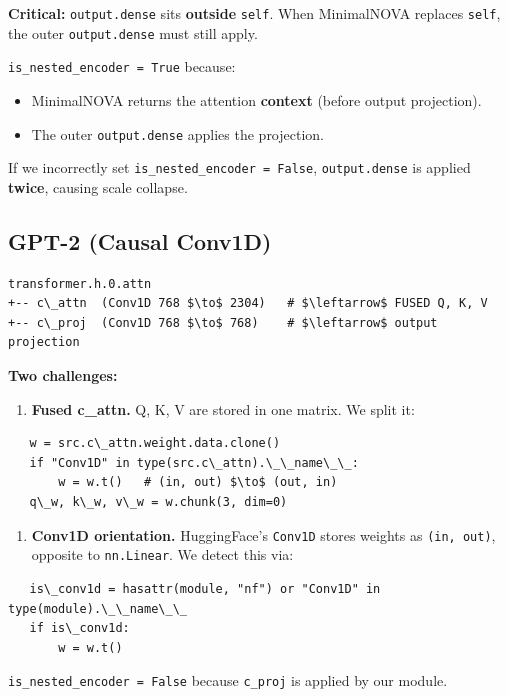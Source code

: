 \textbf{Critical:} \texttt{output.dense} sits \textbf{outside} \texttt{self}. When MinimalNOVA 
replaces \texttt{self}, the outer \texttt{output.dense} must still apply.

\texttt{is\_nested\_encoder = True} because:
\begin{itemize}
\item MinimalNOVA returns the attention \textbf{context} (before output projection).
\item The outer \texttt{output.dense} applies the projection.

\end{itemize}
If we incorrectly set \texttt{is\_nested\_encoder = False}, \texttt{output.dense} is applied 
\textbf{twice}, causing scale collapse.

\subsection{GPT-2 (Causal Conv1D)}

\begin{lstlisting}
transformer.h.0.attn
+-- c\_attn  (Conv1D 768 $\to$ 2304)   # $\leftarrow$ FUSED Q, K, V
+-- c\_proj  (Conv1D 768 $\to$ 768)    # $\leftarrow$ output projection
\end{lstlisting}

\textbf{Two challenges:}

\begin{enumerate}
\item \textbf{Fused c\_attn.} Q, K, V are stored in one matrix. We split it:
\end{enumerate}
\begin{lstlisting}
   w = src.c\_attn.weight.data.clone()
   if "Conv1D" in type(src.c\_attn).\_\_name\_\_:
       w = w.t()   # (in, out) $\to$ (out, in)
   q\_w, k\_w, v\_w = w.chunk(3, dim=0)
\end{lstlisting}

\begin{enumerate}
\item \textbf{Conv1D orientation.} HuggingFace's \texttt{Conv1D} stores weights as
  \texttt{(in, out)}, opposite to \texttt{nn.Linear}. We detect this via:
\end{enumerate}
\begin{lstlisting}
   is\_conv1d = hasattr(module, "nf") or "Conv1D" in type(module).\_\_name\_\_
   if is\_conv1d:
       w = w.t()
\end{lstlisting}

\texttt{is\_nested\_encoder = False} because \texttt{c\_proj} is applied by our module.

